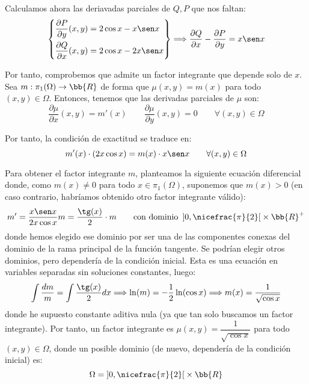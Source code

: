 \begin{ejercicio}
\begin{enumerate}
        Calculamos ahora las deriavadas parciales de $Q,P$ que nos faltan:
        \begin{equation*}
            \left\{
                \begin{aligned}
                    \frac{\partial P}{\partial y}(x,y) &= 2\cos x - x\sen x\\
                    \frac{\partial Q}{\partial x}(x,y) &= 2\cos x - 2x\sen x
                \end{aligned}
            \right\}
            \Longrightarrow
            \dfrac{\partial Q}{\partial x}-\dfrac{\partial P}{\partial y} = x\sen x
        \end{equation*}

        Por tanto, comprobemos que admite un factor integrante que depende solo de $x$. Sea $m:\pi_1(\Omega)\to \bb{R}$ de forma que $\mu(x,y)=m(x)$ para todo $(x,y)\in\Omega$. Entonces, tenemos que las derivadas parciales de $\mu$ son:
        \begin{equation*}
            \dfrac{\partial \mu}{\partial x}(x,y)=m'(x)\qquad \dfrac{\partial \mu}{\partial y}(x,y)=0\qquad \forall (x,y)\in\Omega
        \end{equation*}

        Por tanto, la condición de exactitud se traduce en:
        \begin{equation*}
            m'(x)\cdot (2x\cos x) = m(x)\cdot x\sen x \qquad \forall (x,y)\in\Omega
        \end{equation*}

        Para obtener el factor integrante $m$, planteamos la siguiente ecuación diferencial donde, como $m(x)\neq 0$ para todo $x\in\pi_1(\Omega)$, suponemos que $m(x)>0$ (en caso contrario, habríamos obtenido otro factor integrante válido):
        \begin{equation*}
            m'=\dfrac{x\sen x}{2x\cos x} m
            = \dfrac{\tg(x)}{2}\cdot m            
            \qquad \text{con dominio } \left]0,\nicefrac{\pi}{2}\right[\times \bb{R}^+
        \end{equation*}
        donde hemos elegido ese dominio por ser una de las componentes conexas del dominio de la rama principal de la función tangente. Se podrían elegir otros dominios, pero dependería de la condición inicial. Esta es una ecuación en variables separadas sin soluciones constantes, luego:
        \begin{align*}
            \int \frac{dm}{m} = \int \frac{\tg(x)}{2}dx
            \Longrightarrow \ln (m) = -\frac{1}{2}\ln (\cos x)
            \Longrightarrow m(x) = \frac{1}{\sqrt{\cos x}}
        \end{align*}
        donde he supuesto constante aditiva nula (ya que tan solo buscamos un factor integrante). Por tanto, un factor integrante es $\mu(x,y)=\dfrac{1}{\sqrt{\cos x}}$ para todo $(x,y)\in\Omega$, donde un posible dominio (de nuevo, dependería de la condición inicial) es:
        \begin{equation*}
            \Omega=\left]0,\nicefrac{\pi}{2}\right[\times \bb{R}
        \end{equation*}


\end{enumerate}
\end{ejercicio}
